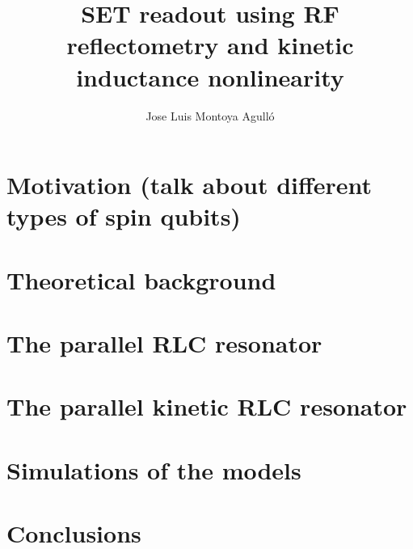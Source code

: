 \documentclass{article}
\title{
\textbf{SET readout using RF reflectometry and kinetic inductance nonlinearity}
}
\author{Jose Luis Montoya Agull\'o}
\date{}
\numberwithin{equation}{section}
\begin{document}
\maketitle
\begin{abstract}
\lipsum[1-1]
\end{abstract}


\newpage
\tableofcontents{}

\newpage
\section{Motivation (talk about different types of spin qubits)}


\newpage
\section{Theoretical background}


\newpage
\section{The parallel RLC resonator}


\newpage
\section{The parallel kinetic RLC resonator}


\newpage
\section{Simulations of the models}


\newpage
\section{Conclusions}


%
% 
\end{document}
